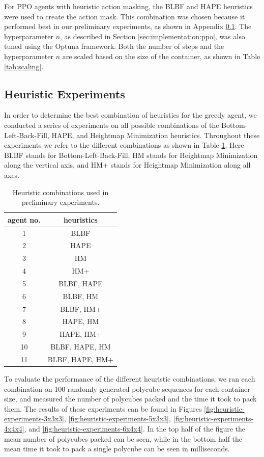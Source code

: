 \documentclass[conference]{IEEEtran}
\begin{document}
For PPO agents with heuristic action masking, the BLBF and HAPE heuristics were used to create the action mask.
This combination was chosen because it performed best in our preliminary experiments, as shown in Appendix \ref{app:heuristics}.
The hyperparameter $n$, as described in Section \ref{sec:implementation:ppo}, was also tuned using the Optuna framework. 
Both the number of steps and the hyperparameter $n$ are scaled based on the size of the container, as shown in Table \ref{tab:scaling}.

\subsection{Heuristic Experiments} \label{app:heuristics}
In order to determine the best combination of heuristics for the greedy agent, we conducted a series of experiments on all possible combinations of the Bottom-Left-Back-Fill, HAPE, and Heightmap Minimization heuristics.
Throughout these experiments we refer to the different combinations as shown in Table \ref{tab:heuristics}.
Here BLBF stands for Bottom-Left-Back-Fill, HM stands for Heightmap Minimization along the vertical axis, and HM+ stands for Heightmap Minimization along all axes.

\begin{table}[!htb]
    \centering
    \caption{Heuristic combinations used in preliminary experiments.\label{tab:heuristics}}
    \begin{tabular}{c|c}
    \textbf{agent no.} & \textbf{heuristics} \\ \hline
    1 & BLBF \\
    2 & HAPE \\
    3 & HM \\
    4 & HM+ \\
    5 & BLBF, HAPE \\
    6 & BLBF, HM \\
    7 & BLBF, HM+ \\
    8 & HAPE, HM \\
    9 & HAPE, HM+ \\
    10 & BLBF, HAPE, HM \\
    11 & BLBF, HAPE, HM+
    \end{tabular}
\end{table}

To evaluate the performance of the different heuristic combinations, we ran each combination on 100 randomly generated polycube sequences for each container size, and measured the number of polycubes packed and the time it took to pack them.
The results of these experiments can be found in Figures \ref{fig:heuristic-experiments-3x3x3}, \ref{fig:heuristic-experiments-5x3x3}, \ref{fig:heuristic-experiments-4x4x4}, and \ref{fig:heuristic-experiments-6x4x4}.
In the top half of the figure the mean number of polycubes packed can be seen, while in the bottom half the mean time it took to pack a single polycube can be seen in milliseconds.
\end{document}
